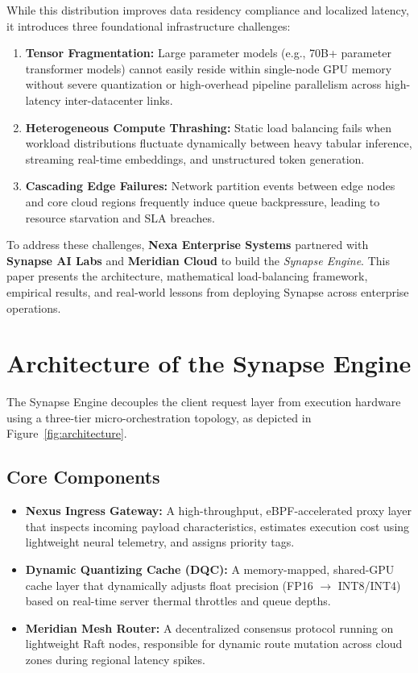 \documentclass[10pt, a4paper]{article}
\begin{document}
While this distribution improves data residency compliance and localized latency, it introduces three foundational infrastructure challenges:
\begin{enumerate}[label=\bfseries C\arabic*., leftmargin=2em]
  \item \textbf{Tensor Fragmentation:} Large parameter models (e.g., 70B+ parameter transformer models) cannot easily reside within single-node GPU memory without severe quantization or high-overhead pipeline parallelism across high-latency inter-datacenter links.
  \item \textbf{Heterogeneous Compute Thrashing:} Static load balancing fails when workload distributions fluctuate dynamically between heavy tabular inference, streaming real-time embeddings, and unstructured token generation.
  \item \textbf{Cascading Edge Failures:} Network partition events between edge nodes and core cloud regions frequently induce queue backpressure, leading to resource starvation and SLA breaches.
\end{enumerate}

To address these challenges, \textbf{Nexa Enterprise Systems} partnered with \textbf{Synapse AI Labs} and \textbf{Meridian Cloud} to build the \emph{Synapse Engine}. This paper presents the architecture, mathematical load-balancing framework, empirical results, and real-world lessons from deploying Synapse across enterprise operations.

\vspace{10pt}

\section{Architecture of the Synapse Engine}

The Synapse Engine decouples the client request layer from execution hardware using a three-tier micro-orchestration topology, as depicted in Figure~\ref{fig:architecture}.

\subsection{Core Components}
\begin{itemize}[leftmargin=1.5em]
  \item \textbf{Nexus Ingress Gateway:} A high-throughput, eBPF-accelerated proxy layer that inspects incoming payload characteristics, estimates execution cost using lightweight neural telemetry, and assigns priority tags.
  \item \textbf{Dynamic Quantizing Cache (DQC):} A memory-mapped, shared-GPU cache layer that dynamically adjusts float precision (FP16 $\rightarrow$ INT8/INT4) based on real-time server thermal throttles and queue depths.
  \item \textbf{Meridian Mesh Router:} A decentralized consensus protocol running on lightweight Raft nodes, responsible for dynamic route mutation across cloud zones during regional latency spikes.
\end{itemize}
\end{document}
